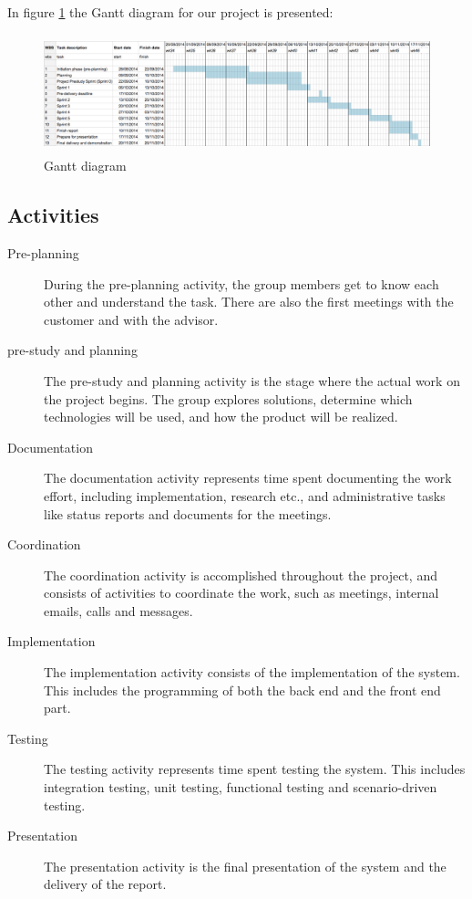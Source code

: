\documentclass[11pt,a4paper,titlepage,oneside]{report}
\begin{document}
In figure \ref{fig:gantt} the Gantt diagram for our project is presented:
\begin{figure}[h]
\begin{center}
\includegraphics[height=130px,width=440px]{img/gantt.png}
\caption{Gantt diagram}
\label{fig:gantt}
\medskip
\small
\end{center}
\end{figure}

\subsection{Activities}
\begin{description}
\item[Pre-planning] During the pre-planning activity, the group members get to know each other and understand the task. There are also the first meetings with the customer and with the advisor.
\item[\Gls{pre-study} and planning] The \gls{pre-study} and planning activity is the stage where the actual work on the project begins. The group explores solutions, determine which technologies will be used, and how the product will be realized.
\item[Documentation] The documentation activity represents time spent documenting the work effort, including implementation, research etc., and administrative tasks like status reports and documents for the meetings.
\item[Coordination] The coordination activity is accomplished throughout the project, and consists of activities to coordinate the work, such as meetings, internal emails, calls and messages.
\item[Implementation] The implementation activity consists of the implementation of the system. This includes the programming of both the back end and the front end part.
\item[Testing] The testing activity represents time spent testing the system. This includes integration testing, unit testing, functional testing and scenario-driven testing.
\item[Presentation] The presentation activity is the final presentation of the system and the delivery of the report.
\end{description}
\end{document}

